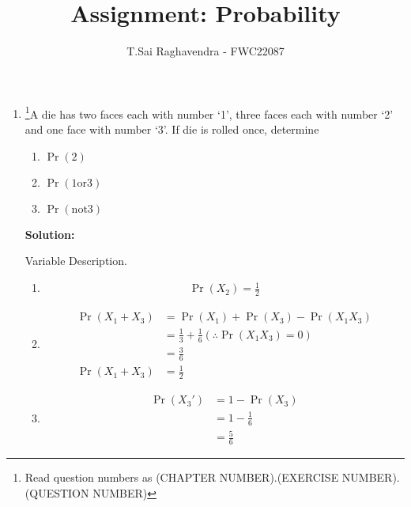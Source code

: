 \documentclass{article}
\providecommand{\pr}[1]{\ensuremath{\Pr\left(#1\right)}}
\newcommand{\solution}{\noindent \textbf{Solution: }}
\begin{document}
\title{Assignment: Probability}
\author{\Large T.Sai Raghavendra - FWC22087}
\date{}


\maketitle
\begin{enumerate}[label=16.\arabic{enumi}.\arabic{enumii}]%
\setcounter{enumi}{3}
\setcounter{enumii}{3}

\item \footnote{Read question numbers as (CHAPTER NUMBER).(EXERCISE NUMBER).(QUESTION NUMBER)}A die has two faces each with number ‘1’, three faces each with number ‘2’ and one face with number ‘3’. If die is rolled once, determine
\begin{enumerate}
\item \pr{2}
\item \pr{1 \text{or} 3}
\item \pr{\text{not} 3}
\end{enumerate}

\solution
	\begin{table}[h]
	
	\caption{Variable Description.}
	\label{tables:table1}
	\end{table}

\begin{enumerate}
\item \begin{align}
\pr{X_2} = \frac{1}{2}  %
\end{align}	
\item 
\begin{align}
\pr{X_1 + X_3}	&= \pr{X_1} + \pr{X_3} - \pr{X_1X_3}\\
				&= \frac{1}{3} + \frac{1}{6}   (\therefore \pr{X_1X_3} = 0)\\
				&= \frac{3}{6}\\
\pr{X_1 + X_3} 	&= \frac{1}{2}
\end{align}
\item 
\begin{align}
\pr{X_3\prime} &= 1 - \pr{X_3}\\
			   &= 1 - \frac{1}{6}\\
			   &= \frac{5}{6}
\end{align}
\end{enumerate}
\end{enumerate}
\end{document}

